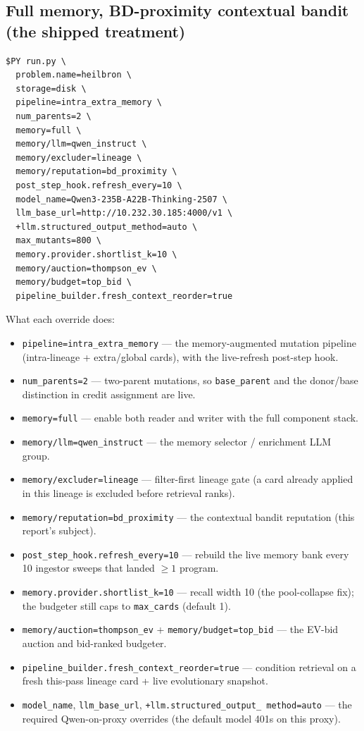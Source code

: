\documentclass[11pt]{article}
\newcommand{\code}[1]{\texttt{#1}}
\begin{document}
\subsection{Full memory, BD-proximity contextual bandit (the shipped treatment)}
\begin{lstlisting}
$PY run.py \
  problem.name=heilbron \
  storage=disk \
  pipeline=intra_extra_memory \
  num_parents=2 \
  memory=full \
  memory/llm=qwen_instruct \
  memory/excluder=lineage \
  memory/reputation=bd_proximity \
  post_step_hook.refresh_every=10 \
  model_name=Qwen3-235B-A22B-Thinking-2507 \
  llm_base_url=http://10.232.30.185:4000/v1 \
  +llm.structured_output_method=auto \
  max_mutants=800 \
  memory.provider.shortlist_k=10 \
  memory/auction=thompson_ev \
  memory/budget=top_bid \
  pipeline_builder.fresh_context_reorder=true
\end{lstlisting}
What each override does:
\begin{itemize}[leftmargin=2em,itemsep=1pt]
\item \code{pipeline=intra\_extra\_memory} --- the memory-augmented mutation
pipeline (intra-lineage + extra/global cards), with the live-refresh post-step hook.
\item \code{num\_parents=2} --- two-parent mutations, so \code{base\_parent} and
the donor/base distinction in credit assignment are live.
\item \code{memory=full} --- enable both reader and writer with the full
component stack.
\item \code{memory/llm=qwen\_instruct} --- the memory selector / enrichment LLM
group.
\item \code{memory/excluder=lineage} --- filter-first lineage gate (a card already
applied in this lineage is excluded before retrieval ranks).
\item \code{memory/reputation=bd\_proximity} --- the contextual bandit reputation
(this report's subject).
\item \code{post\_step\_hook.refresh\_every=10} --- rebuild the live memory bank
every 10 ingestor sweeps that landed $\ge 1$ program.
\item \code{memory.provider.shortlist\_k=10} --- recall width 10 (the pool-collapse
fix); the budgeter still caps to \code{max\_cards} (default 1).
\item \code{memory/auction=thompson\_ev} + \code{memory/budget=top\_bid} --- the
EV-bid auction and bid-ranked budgeter.
\item \code{pipeline\_builder.fresh\_context\_reorder=true} --- condition retrieval
on a fresh this-pass lineage card + live evolutionary snapshot.
\item \code{model\_name}, \code{llm\_base\_url}, \code{+llm.structured\_output\_
method=auto} --- the required Qwen-on-proxy overrides (the default model 401s on
this proxy).
\end{itemize}
\end{document}
